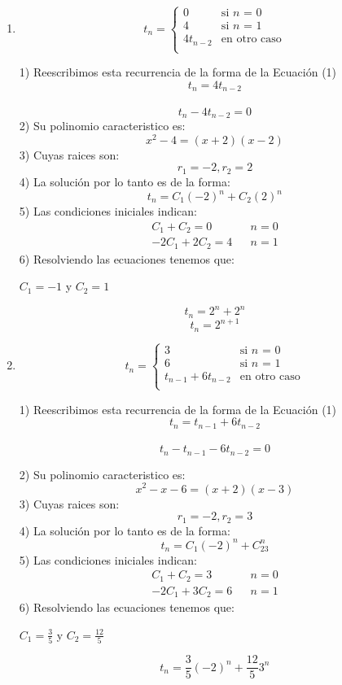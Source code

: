 \documentclass{article}
\theoremstyle{definition}
\theoremstyle{remark}
\begin{document}
\begin{enumerate}[1.]
\item  $$t_n = \left \{ 
\begin{matrix} 
0 & \mbox{si }n\mbox{ = 0}\\ 
4 & \mbox{si }n\mbox{ = 1}\\
4t_{n-2} & \mbox{en}\mbox{ otro caso}\\
\end{matrix}
\right. $$

1) Reescribimos esta recurrencia de la forma de la Ecuaci\'on (1) \\
$$ t_n = 4t_{n-2} $$\\
$$ t_n-4t_{n-2}=0 $$
2) Su polinomio caracteristico es:\\
$$ x^{2}-4=(x+2)(x-2)$$
3) Cuyas raices son:\\ 
$$r_1=-2 , r_2=2$$
4) La soluci\'on por lo tanto es de la forma:\\
$$t_n = C_1(-2)^{n} + C_2(2)^{n}$$
5) Las condiciones iniciales indican: \\
\begin{align*}
C_{1}+C_{2}=0& & n=0\\
-2C_{1}+2C_{2}=4& & n=1
\end{align*}
6) Resolviendo las ecuaciones tenemos que:\\
\begin{center}
$C_1=-1$ y $C_2=1$
\end{center}
$$t_n=2^{n} + 2^{n} $$
$$t_n=2^{n+1} $$
\clearpage

\item  $$t_n = \left \{ 
\begin{matrix} 
3 & \mbox{si }n\mbox{ = 0}\\ 
6 & \mbox{si }n\mbox{ = 1}\\
t_{n-1}+6t_{n-2}  & \mbox{en}\mbox{ otro caso}\\
\end{matrix}
\right. $$

1) Reescribimos esta recurrencia de la forma de la Ecuaci\'on (1) \\
$$ t_n = t_{n-1} + 6t_{n-2} $$\\
$$ t_n - t_{n-1} - 6t_{n-2} = 0 $$

2) Su polinomio caracteristico es:\\
$$ x^{2}-x-6=(x+2)(x-3)$$
3) Cuyas raices son:\\ 
$$ r_1=-2 , r_2=3 $$
4) La soluci\'on por lo tanto es de la forma:\\
$$t_n = C_1(-2)^{n} + C_23^{n}$$
5) Las condiciones iniciales indican: \\
\begin{align*}
C_{1}+C_{2}=3& & n=0\\
-2C_{1}+3C_{2}=6& & n=1
\end{align*}
6) Resolviendo las ecuaciones tenemos que:\\
\begin{center}
$C_1=\frac{3}{5}$ y $C_2=\frac{12}{5}$
\end{center}
$$t_n=\frac{3}{5}(-2)^{n} + \frac{12}{5}3^{n} $$
\clearpage


\end{enumerate}
\end{document}
